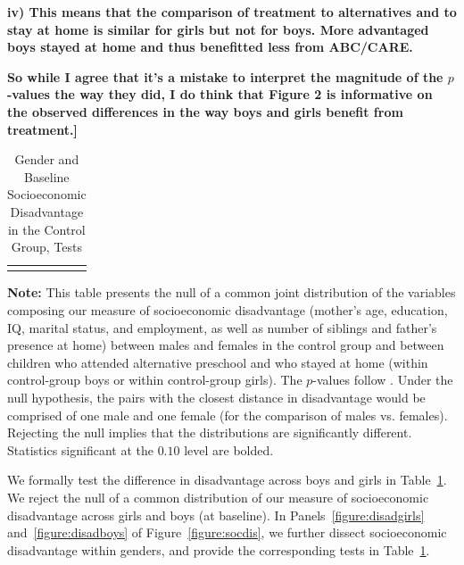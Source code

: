 \textbf{iv) This means that the comparison of treatment to alternatives and to stay at home is similar for girls but not for boys. More advantaged boys stayed at home and thus benefitted less from ABC/CARE.}

 \textbf{So while I agree that it's a mistake to interpret the magnitude of the $p$-values the way they did, I do think that Figure 2 is informative on the observed differences in the way boys and girls benefit from treatment.] } 


\begin{table}[!htpb]
\begin{threeparttable}
\caption{Gender and Baseline Socioeconomic Disadvantage in the Control Group, Tests} \label{table:disadtests}
\centering
\begin{tabularx}{16.5cm}{XcX}
&  &
\end{tabularx}
\begin{tablenotes}
\footnotesize
\item \textbf{Note:} This table presents the null of a common joint distribution of the variables composing our measure of socioeconomic disadvantage (mother's age, education, IQ, marital status, and employment, as well as number of siblings and father's presence at home) between males and females in the control group and between children who attended  alternative preschool and who stayed at home (within control-group boys or within control-group girls). The $p$-values follow \citet{Rosenbaum_2005_Distribution_JRSS}. Under the null hypothesis, the pairs with the closest distance in disadvantage would be comprised of one male and one female (for the comparison of males vs. females). Rejecting the null implies that the distributions are significantly different. Statistics significant at the $0.10$ level are bolded.
\end{tablenotes}
\end{threeparttable}
\end{table}

We formally test the difference in disadvantage across boys and girls in Table~\ref{table:disadtests}. We reject the null of a common distribution of our measure of socioeconomic disadvantage across girls and boys (at baseline). In Panels~\ref{figure:disadgirls} and~\ref{figure:disadboys} of Figure~\ref{figure:socdis}, we further dissect socioeconomic disadvantage within genders, and provide the corresponding tests in Table~\ref{table:disadtests}.


